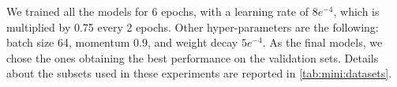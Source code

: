 We trained all the models for 6 epochs, with a learning rate of $8e^{-4}$, which is multiplied by 0.75 every 2 epochs.
Other hyper-parameters are the following: batch size 64, momentum 0.9, and weight decay $5e^{-4}$.
As the final models, we chose the ones obtaining the best performance on the validation sets.
Details about the subsets used in these experiments are reported in \ref{tab:mini:datasets}.





